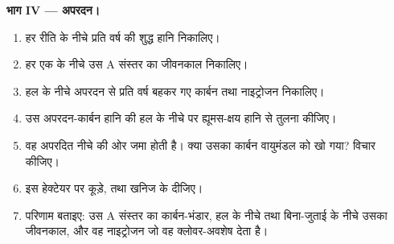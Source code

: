\begin{problem}
\medskip
\noindent\textbf{भाग IV --- अपरदन।}
\begin{enumerate}[resume]
  \item हर रीति के नीचे प्रति वर्ष  की शुद्ध हानि निकालिए।
  \item हर एक के नीचे उस A संस्तर का जीवनकाल निकालिए।
  \item हल के नीचे अपरदन से प्रति वर्ष बहकर गए कार्बन तथा
        नाइट्रोजन निकालिए।
  \item उस अपरदन-कार्बन हानि की हल के नीचे  पर
        ह्यूमस-क्षय हानि से तुलना कीजिए।
  \item वह अपरदित  नीचे की ओर जमा होती है। क्या उसका कार्बन
        वायुमंडल को खो गया? विचार कीजिए।
  \item इस हेक्टेयर पर कूड़े,  तथा खनिज  के 
        दीजिए।
  \item परिणाम बताइए: उस A संस्तर का कार्बन-भंडार, हल के नीचे तथा
        बिना-जुताई के नीचे उसका जीवनकाल, और वह
        नाइट्रोजन जो वह क्लोवर-अवशेष देता है।
\end{enumerate}
\end{problem}
